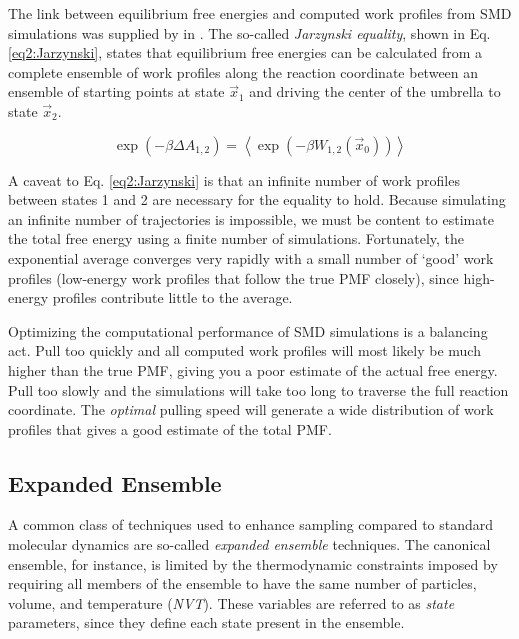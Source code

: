The link between equilibrium free energies and computed work profiles from SMD
simulations was supplied by \citeauthor{Jarzynski_PhysRevLett_1997_v78_p2690} in
\citeyear{Jarzynski_PhysRevLett_1997_v78_p2690}.
\cite{Jarzynski_PhysRevLett_1997_v78_p2690} The so-called \emph{Jarzynski
equality}, shown in Eq. \ref{eq2:Jarzynski}, states that equilibrium free
energies can be calculated from a complete ensemble of work profiles along the
reaction coordinate between an ensemble of starting points at state $\vec{x}_1$
and driving the center of the umbrella to state $\vec{x}_2$.

\begin{equation}
   \exp \left(-\beta \Delta A _{1,2} \right) = 
      \left \langle \exp \left( -\beta W_{1,2}(\vec{x}_0) \right) \right \rangle
   \label{eq2:Jarzynski}
\end{equation}

A caveat to Eq. \ref{eq2:Jarzynski} is that an infinite number of work profiles
between states 1 and 2 are necessary for the equality to hold. Because
simulating an infinite number of trajectories is impossible, we must be content
to estimate the total free energy using a finite number of simulations.
Fortunately, the exponential average converges very rapidly with a small number
of `good' work profiles (\ie low-energy work profiles that follow the true PMF
closely), since high-energy profiles contribute little to the average.

Optimizing the computational performance of SMD simulations is a balancing
act. Pull too quickly and all computed work profiles will most likely be much
higher than the true PMF, giving you a poor estimate of the actual free energy.
Pull too slowly and the simulations will take too long to traverse the full
reaction coordinate. The \emph{optimal} pulling speed will generate a wide
distribution of work profiles that gives a good estimate of the total PMF.

\subsection{Expanded Ensemble}
\label{sec2:ExpandedEnsemble}

A common class of techniques used to enhance sampling compared to standard
molecular dynamics are so-called \emph{expanded ensemble} techniques. The
canonical ensemble, for instance,  is limited by the thermodynamic constraints
imposed by requiring all members of the ensemble to have the same number of
particles, volume, and temperature (\emph{NVT}). These variables are referred to
as \emph{state} parameters, since they define each state present in the
ensemble.

